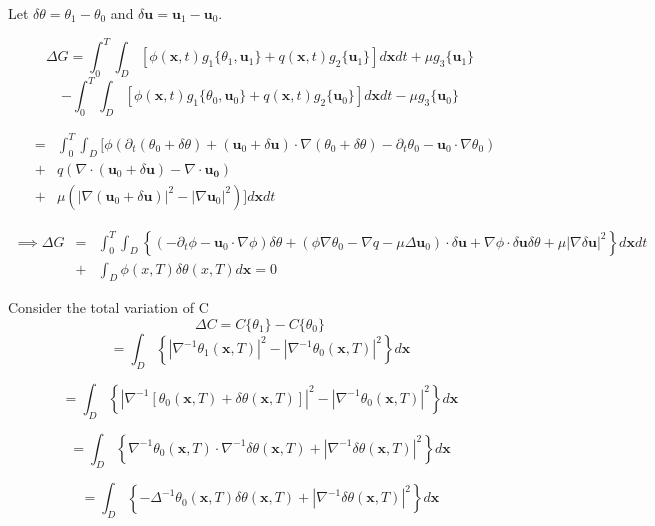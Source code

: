 \documentclass[11pt]{article}
\def \iint {\int_{0}^{T}\int_{D}}
\begin{document}
\begin{flushleft}
 Let $\delta\theta=\theta_{1}-\theta_{0}$ and $\delta \mathbf{u}=\mathbf{u}_{1}-\mathbf{u}_{0}$.
 
 \[\Delta G=\iint [\phi(\mathbf{x},t) g_{1}\{\theta_{1},\mathbf{u}_{1}\} + q(\mathbf{x},t) g_{2}\{\mathbf{u}_{1}\}]d\mathbf{x}dt+\mu g_{3}\{\mathbf{u}_{1}\}\]
  \[-\iint [\phi(\mathbf{x},t) g_{1}\{\theta_{0},\mathbf{u}_{0}\} + q(\mathbf{x},t) g_{2}\{\mathbf{u}_{0}\}]d\mathbf{x}dt-\mu g_{3}\{\mathbf{u}_{0}\}\]
  
  \begin{eqnarray*}
 	 &=& \iint [
  		\phi\left(
  			\partial_{t}(\theta_{0}+\delta\theta)+(\mathbf{u}_{0}+\delta\mathbf{u})\cdot \nabla(\theta_{0}+\delta\theta)
  			-\partial_{t}\theta_{0}-\mathbf{u}_{0}\cdot \nabla 					\theta_{0}
	  	\right) \\
	&+& q\left(
		\nabla\cdot(\mathbf{u}_{0}+\delta\mathbf{u})-\nabla\cdot\mathbf{u_{0}}	
	  	\right) \\
	&+&\mu \left( 
		 	 |\nabla(\mathbf{u}_{0}+\delta\mathbf{u})|^{2}- |\nabla \mathbf{u}_{0}|^{2}
	  	\right)
  ]d\mathbf{x}dt
\end{eqnarray*}

  \begin{eqnarray*}
 	\implies \Delta G &=& \iint \left\{
  		(-\partial_{t}\phi-\mathbf{u}_{0}\cdot\nabla\phi)\delta\theta
		+( \phi \nabla\theta_{0} - \nabla q -\mu \Delta \mathbf{u}_{0})\cdot \delta\mathbf{u}
		 +\nabla\phi\cdot\delta\mathbf{u}\delta \theta 
		 +\mu |\nabla\delta \mathbf{u}|^{2}  
  		\right\}d\mathbf{x}dt \\
  &+& \int_{D}\phi(x,T)\delta\theta(x,T)d\mathbf{x} = 0
\end{eqnarray*}
 
  
 
  Consider the total variation of C
 \[ \Delta C= C\{\theta_{1}\}-C\{\theta_{0}\} \] 
 \[=\int_{D}\left\{ |\nabla^{-1}\theta_{1}(\mathbf{x},T)|^{2} - |\nabla^{-1} \theta_{0}(\mathbf{x},T)|^{2} \right\} d\mathbf{x} \]
 
\[=\int_{D}\left\{ 
  			|\nabla^{-1} \left[
  				\theta_{0}(\mathbf{x},T)+\delta\theta(\mathbf{x},T)											\right]|^{2} 
  			- |\nabla^{-1} \theta_{0}(\mathbf{x},T)|^{2} 
  		\right\} 
d\mathbf{x} \]
  
\[
	=\int_{D}
	\left\{ 
   		\nabla^{-1}\theta_{0}(\mathbf{x},T)\cdot
   		\nabla^{-1} \delta\theta(\mathbf{x},T)
   		+|\nabla^{-1} 
		\delta\theta(\mathbf{x},T)|^{2} 
   \right\} 
   d\mathbf{x}  
\]
 
\[
	=\int_{D}
	\left\{ 
   		-\Delta^{-1}\theta_{0}(\mathbf{x},T)\delta\theta(\mathbf{x},T)
   		+|\nabla^{-1} 
		\delta\theta(\mathbf{x},T)|^{2} 
   \right\} 
   d\mathbf{x}  
\]
 

\end{flushleft}
\end{document}
